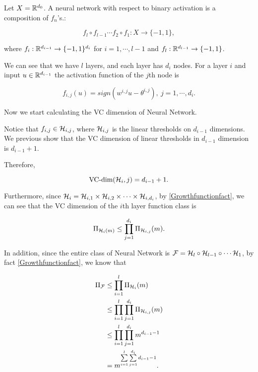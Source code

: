\documentclass[../main.tex]{subfiles}
\begin{document}
	 \begin{definition}
	 	Let $X = \mathbb{R}^{d_0}$. A neural network with respect to binary activation is a composition of $f_n $'s.: 
	 	
	 	\begin{equation}
	 	f_l \circ f_{l-1} \cdots f_2 \circ f_1: X \to \{-1,1\},
	 	\end{equation}
	 	
	 	where $f_i:\mathbb{R}^{d_{i-1}} \to \{-1, 1\}^{d_i}$ for $i = 1,\cdots, l-1$ and $f_l: \mathbb{R}^{d_{l-1}} \to \{-1,1\}$.
	
	
	We can see that we have $l$ layers, and each layer has $d_i$ nodes. For a layer $i$ and input $u \in \mathbb{R}^{d_{i-1}}$ the activation function of the $j$th node is
	
		\begin{equation}
			f_{i,j}(u) = sign(w^{i,j}u-\theta^{i,j}), \ j = 1,\cdots, d_i.
		\end{equation}
	 \end{definition}
 
 	Now we start calculating the VC dimension of Neural Network.
 	
 	Notice that $f_{i,j} \in \mathcal{H}_{i,j}$, where $\mathcal{H}_{i,j}$ is the linear thresholds on $d_{i-1}$ dimensions. We previous show that the VC dimension of linear thresholds in $d_{i-1}$ dimension is $d_{i-1} + 1$.
 	
 	Therefore, 
 	
 	\begin{equation*}
 		\textmd{VC-dim}(\mathcal{H}_i,j) = d_{i-1} + 1.
 	\end{equation*}
 
 	Furthermore, since $\mathcal{H}_i = \mathcal{H}_{i,1} \times \mathcal{H}_{i,2} \times \cdots \times \mathcal{H}_{i,d_i}$, by \ref{Growthfunctionfact}, we can see that the VC dimension of the $i$th layer function class is 
 	
 	\begin{equation*}
 		\Pi_{\mathcal{H}_i(m)} \leq \prod\limits_{j=1}^{d_i} \Pi_{\mathcal{H}_{i,j}}(m).
 	\end{equation*}
 	
 	In addition, since the entire class of Neural Network is $\mathcal{F} = \mathcal{H}_l \circ \mathcal{H}_{l-1} \circ \cdots \mathcal{H}_1$, by fact \ref{Growthfunctionfact}, we know that
 	
 	\begin{equation*}
 		\begin{aligned}
 		 	\Pi_{\mathcal{F}} & \leq \prod\limits_{i=1}^l \Pi_{\mathcal{H}_i}(m) \\
 		 			 & \leq \prod\limits_{i=1}^l \prod\limits_{j=1}^{d_i} \Pi_{\mathcal{H}_{i,j}}(m) \\
 		 			 & \leq \prod\limits_{i=1}^l \prod\limits_{j=1}^{d_i} m^{d_{i-1} - 1} \\
 		 			 & =  m^{\sum\limits_{i=1}^l \sum\limits_{j=1}^{d_i}d_{i-1} - 1}.
 		\end{aligned}
 	\end{equation*}
\end{document}
